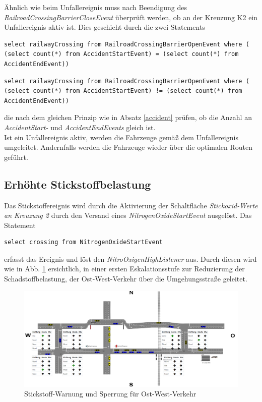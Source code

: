 Ähnlich wie beim Unfallereignis muss nach Beendigung des \textit{RailroadCrossingBarrierCloseEvent} überprüft werden, ob an der Kreuzung K2 ein Unfallereignis aktiv ist. Dies geschieht durch die zwei Statements 

\begin{lstlisting}
select railwayCrossing from RailroadCrossingBarrierOpenEvent where ( (select count(*) from AccidentStartEvent) = (select count(*) from AccidentEndEvent))
\end{lstlisting}

\begin{lstlisting}
select railwayCrossing from RailroadCrossingBarrierOpenEvent where ( (select count(*) from AccidentStartEvent) != (select count(*) from AccidentEndEvent))
\end{lstlisting}

die nach dem gleichen Prinzip wie in Absatz \ref{accident} prüfen, ob die Anzahl an \textit{AccidentStart-} und \textit{AccidentEndEvents} gleich ist.\\
Ist ein Unfallereignis aktiv, werden die Fahrzeuge gemäß dem Unfallereignis umgeleitet. Andernfalls werden die Fahrzeuge wieder über die optimalen Routen geführt.


\subsection{Erhöhte Stickstoffbelastung}

Das Stickstoffereignis wird durch die Aktivierung der Schaltfläche \textit{Stickoxid-Werte an Kreuzung 2} durch den Versand eines \textit{NitrogenOxideStartEvent} ausgelöst. Das Statement

\begin{lstlisting}
select crossing from NitrogenOxideStartEvent
\end{lstlisting}

erfasst das Ereignis und löst den \textit{NitroOxigenHighListener} aus. Durch diesen wird wie in Abb. \ref{fig8} ersichtlich, in einer ersten Eskalationsstufe zur Reduzierung der Schadstoffbelastung, der Ost-West-Verkehr über die Umgehungsstraße geleitet. 

\begin{figure}[ht]
	\includegraphics[width=\textwidth]{images/NitroOxigenHigh.png}
	\caption{Stickstoff-Warnung und Sperrung für Ost-West-Verkehr}
	\label{fig8}
\end{figure}

